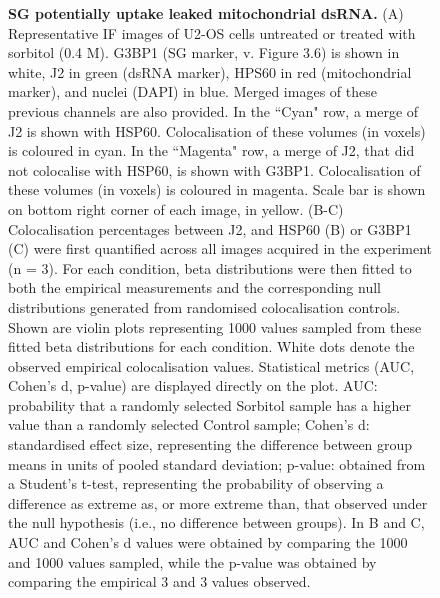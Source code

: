 \begin{figure}[t]
	\captionsetup{labelformat=adja-page}
	\ContinuedFloat
	\caption[]{\textbf{SG potentially uptake leaked mitochondrial dsRNA.} (A) Representative IF images of U2-OS cells untreated or treated with sorbitol (0.4 M). G3BP1 (SG marker, v. Figure 3.6) is shown in white, J2 in green (dsRNA marker\cite{krieger_trafficking_2024}), HPS60 in red (mitochondrial marker\cite{el_manaa_transcription-_2021}), and nuclei (DAPI) in blue. Merged images of these previous channels are also provided. In the ``Cyan" row, a merge of J2 is shown with HSP60. Colocalisation of these volumes (in voxels) is coloured in cyan. In the ``Magenta" row, a merge of J2, that did not colocalise with HSP60, is shown with G3BP1. Colocalisation of these volumes (in voxels) is coloured in magenta. Scale bar is shown on bottom right corner of each image, in yellow. (B-C) Colocalisation percentages between J2, and HSP60 (B) or G3BP1 (C) were first quantified across all images acquired in the experiment (n = 3). For each condition, beta distributions were then fitted to both the empirical measurements and the corresponding null distributions generated from randomised colocalisation controls. Shown are violin plots representing 1000 values sampled from these fitted beta distributions for each condition. White dots denote the observed empirical colocalisation values. Statistical metrics (AUC, Cohen’s d, p-value) are displayed directly on the plot. AUC: probability that a randomly selected Sorbitol sample has a higher value than a randomly selected Control sample; Cohen’s d: standardised effect size, representing the difference between group means in units of pooled standard deviation; p-value: obtained from a Student’s t-test, representing the probability of observing a difference as extreme as, or more extreme than, that observed under the null hypothesis (i.e., no difference between groups). In B and C, AUC and Cohen's d values were obtained by comparing the 1000 and 1000 values sampled, while the p-value was obtained by comparing the empirical 3 and 3 values observed.}
\end{figure}
